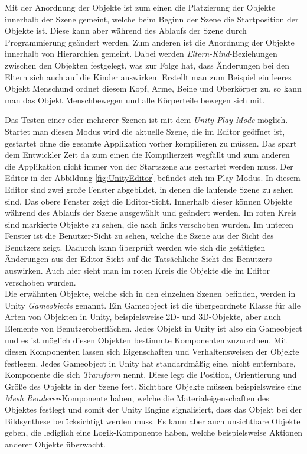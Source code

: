 Mit der Anordnung der Objekte ist zum einen die Platzierung der Objekte innerhalb der Szene gemeint, welche beim Beginn der Szene die Startposition der Objekte ist. Diese kann aber während des Ablaufs der Szene durch Programmierung geändert werden. Zum anderen ist die Anordnung der Objekte innerhalb von Hierarchien gemeint. Dabei werden \textit{Eltern-Kind}-Beziehungen zwischen den Objekten festgelegt, was zur Folge hat, dass Änderungen bei den Eltern sich auch auf die Kinder auswirken. Erstellt man zum Beispiel ein leeres Objekt \glqq Mensch\grqq und ordnet diesem Kopf, Arme, Beine und Oberkörper zu, so kann man das Objekt \glqq Mensch\grqq bewegen und alle Körperteile bewegen sich mit. 

Das Testen einer oder mehrerer Szenen ist mit dem \textit{Unity Play Mode} möglich. Startet man diesen Modus wird die aktuelle Szene, die im Editor geöffnet ist, gestartet ohne die gesamte Applikation vorher kompilieren zu müssen. Das spart dem Entwickler Zeit da zum einen die Kompilierzeit wegfällt und zum anderen die Applikation nicht immer von der Startszene aus gestartet werden muss. Der Editor in der Abbildung \ref{fig:UnityEditor} befindet sich im Play Modus. In diesem Editor sind zwei große Fenster abgebildet, in denen die laufende Szene zu sehen sind. Das obere Fenster zeigt die Editor-Sicht. Innerhalb dieser können Objekte während des Ablaufs der Szene ausgewählt und geändert werden. Im roten Kreis sind markierte Objekte zu sehen, die nach links verschoben wurden. Im unteren Fenster ist die Benutzer-Sicht zu sehen, welche die Szene aus der Sicht des Benutzers zeigt. Dadurch kann überprüft werden wie sich die getätigten Änderungen aus der Editor-Sicht auf die Tatsächliche Sicht des Benutzers auswirken. Auch hier sieht man im roten Kreis die Objekte die im Editor verschoben wurden.\\

Die erwähnten Objekte, welche sich in den einzelnen Szenen befinden, werden in Unity \textit{Gameobjects} genannt. Ein Gameobject ist die übergeordnete Klasse für alle Arten von Objekten in Unity, beispielsweise 2D- und 3D-Objekte, aber auch Elemente von Benutzeroberflächen. Jedes Objekt in Unity ist also ein Gameobject und es ist möglich diesen Objekten bestimmte Komponenten zuzuordnen. Mit diesen Komponenten lassen sich Eigenschaften und Verhaltensweisen der Objekte festlegen. Jedes Gameobject in Unity hat standardmäßig eine, nicht entfernbare, Komponente die sich \textit{Transform} nennt. Diese legt die Position, Orientierung und Größe des Objekts in der Szene fest. Sichtbare Objekte müssen beispielsweise eine \textit{Mesh Renderer}-Komponente haben, welche die Materialeigenschaften des Objektes festlegt und somit der Unity Engine signalisiert, dass das Objekt bei der Bildsynthese berücksichtigt werden muss. Es kann aber auch unsichtbare Objekte geben, die lediglich eine Logik-Komponente haben, welche beispielsweise Aktionen anderer Objekte überwacht.\\

